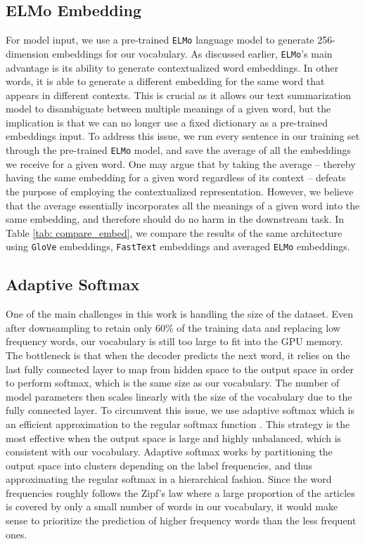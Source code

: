 \subsection{ELMo Embedding}
For model input, we use a pre-trained \texttt{ELMo} language model \cite{peters2018deep} to generate 256-dimension embeddings for our vocabulary. As discussed earlier, \texttt{ELMo}'s main advantage is its ability to generate contextualized word embeddings. In other words, it is able to generate a different embedding for the same word that appears in different contexts. This is crucial as it allows our text summarization model to disambiguate between multiple meanings of a given word, but the implication is that we can no longer use a fixed dictionary as a pre-trained embeddings input. To address this issue, we run every sentence in our training set through the pre-trained \texttt{ELMo} model, and save the average of all the embeddings we receive for a given word. One may argue that by taking the average -- thereby having the same embedding for a given word regardless of its context -- defeats the purpose of employing the contextualized representation. However, we believe that the average essentially incorporates all the meanings of a given word into the same embedding, and therefore should do no harm in the downstream task. In Table \ref{tab: compare_embed}, we compare the results of the same architecture using \texttt{GloVe} embeddings, \texttt{FastText} embeddings and averaged \texttt{ELMo} embeddings. 

\subsection{Adaptive Softmax}
One of the main challenges in this work is handling the size of the dataset. Even after downsampling to retain only $60\%$ of the training data and replacing low frequency words, our vocabulary is still too large to fit into the GPU memory. The bottleneck is that when the decoder predicts the next word, it relies on the last fully connected layer to map from hidden space to the output space in order to perform softmax, which is the same size as our vocabulary. The number of model parameters then scales linearly with the size of the vocabulary due to the fully connected layer. To circumvent this issue, we use adaptive softmax which is an efficient approximation to the regular softmax function \cite{grave2016efficient}. This strategy is the most effective when the output space is large and highly unbalanced, which is consistent with our vocabulary. Adaptive softmax works by partitioning the output space into clusters depending on the label frequencies, and thus approximating the regular softmax in a hierarchical fashion. Since the word frequencies roughly follows the Zipf's law \cite{wilson1949human} where a large proportion of the articles is covered by only a small number of words in our vocabulary, it would make sense to prioritize the prediction of higher frequency words than the less frequent ones. 



